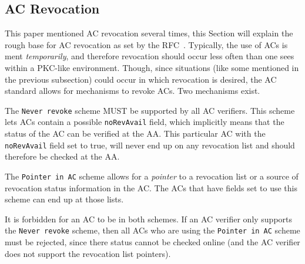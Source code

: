 \documentclass[10pt,conference,a4paper]{IEEEtran}
\begin{document}
\subsection{AC Revocation}
This paper mentioned AC revocation several times, this Section will explain the rough base for AC revocation as set by the RFC~\cite{rfc_ac}. Typically, the use of ACs is ment \textit{temporarily}, and therefore revocation should occur less often than one sees within a PKC-like environment. Though, since situations (like some mentioned in the previous subsection) could occur in which revocation is desired, the AC standard allows for mechanisms to revoke ACs. Two mechanisms exist.

The \texttt{Never revoke} scheme MUST be supported by all AC verifiers. This scheme lets ACs contain a possible \texttt{noRevAvail} field, which implicitly means that the status of the AC can be verified at the AA. This particular AC with the \texttt{noRevAvail} field set to true, will never end up on any revocation list and should therefore be checked at the AA.

The \texttt{Pointer in AC} scheme allows for a \textit{pointer} to a revocation list or a source of revocation status information in the AC. The ACs that have fields set to use this scheme can end up at those lists.

It is forbidden for an AC to be in both schemes. If an AC verifier only supports the \texttt{Never revoke} scheme, then all ACs who are using the \texttt{Pointer in AC} scheme must be rejected, since there status cannot be checked online (and the AC verifier does not support the revocation list pointers).



\end{document}
